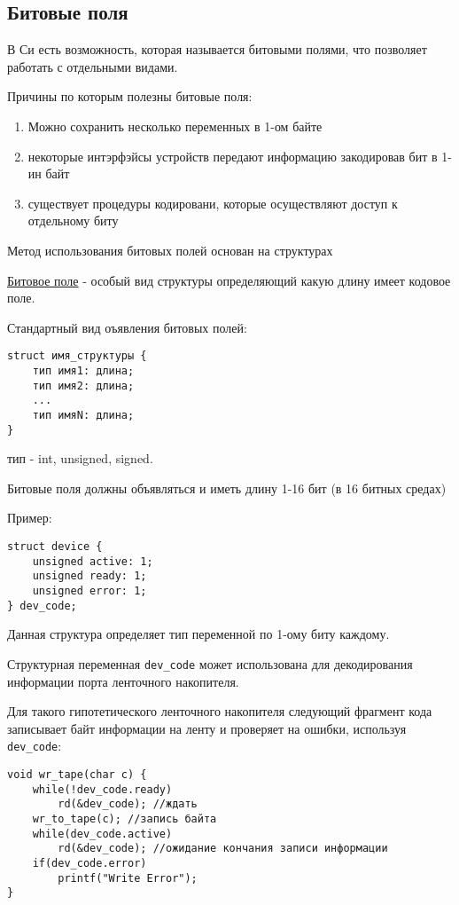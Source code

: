 \subsection{Битовые поля}

В Си есть возможность, которая называется битовыми полями, что позволяет работать с отдельными видами.

Причины по которым полезны битовые поля:
\begin{enumerate}
\item Можно сохранить несколько переменных в 1-ом байте
\item некоторые интэрфэйсы устройств передают информацию закодировав бит в 1-ин байт
\item существует процедуры кодировани, которые осуществляют доступ к отдельному биту
\end{enumerate}

Метод использования битовых полей основан на структурах

\underline{Битовое поле} - особый вид структуры определяющий какую длину имеет кодовое поле.

Стандартный вид оъявления битовых полей:

\begin{verbatim}
struct имя_структуры {
    тип имя1: длина;
    тип имя2: длина;
    ...
    тип имяN: длина;
}
\end{verbatim}

тип - int, unsigned, signed.

Битовые поля должны объявляться и иметь длину 1-16 бит (в 16 битных средах)

Пример:

\begin{verbatim}
struct device {
    unsigned active: 1;
    unsigned ready: 1;
    unsigned error: 1;
} dev_code;
\end{verbatim}

Данная структура определяет тип переменной по 1-ому биту каждому.

Структурная переменная \texttt{dev\_code} может использована для декодирования информации порта ленточного накопителя.

Для такого гипотетического ленточного накопителя следующий фрагмент кода записывает байт информации на ленту и проверяет на ошибки, используя \texttt{dev\_code}:

\begin{verbatim}
void wr_tape(char c) {
    while(!dev_code.ready)
        rd(&dev_code); //ждать
    wr_to_tape(c); //запись байта
    while(dev_code.active)
        rd(&dev_code); //ожидание кончания записи информации
    if(dev_code.error)
        printf("Write Error");
}
\end{verbatim}

